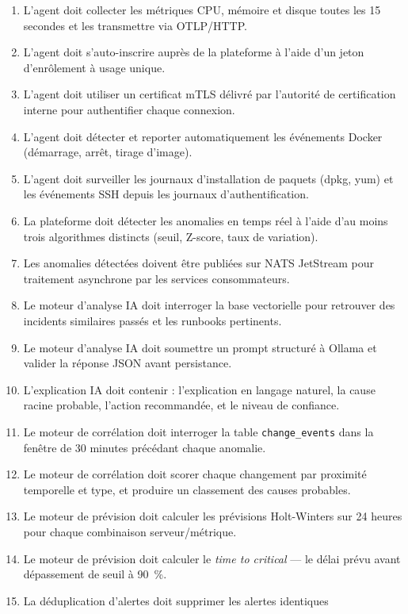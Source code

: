 \begin{enumerate}[label=\textbf{BF\arabic*}, leftmargin=2.2cm, itemsep=4pt]
  \item L'agent doit collecter les métriques CPU, mémoire et disque toutes les
    15 secondes et les transmettre via OTLP/HTTP.
  \item L'agent doit s'auto-inscrire auprès de la plateforme à l'aide d'un jeton
    d'enrôlement à usage unique.
  \item L'agent doit utiliser un certificat mTLS délivré par l'autorité de
    certification interne pour authentifier chaque connexion.
  \item L'agent doit détecter et reporter automatiquement les événements Docker
    (démarrage, arrêt, tirage d'image).
  \item L'agent doit surveiller les journaux d'installation de paquets (dpkg, yum)
    et les événements SSH depuis les journaux d'authentification.
  \item La plateforme doit détecter les anomalies en temps réel à l'aide d'au moins
    trois algorithmes distincts (seuil, Z-score, taux de variation).
  \item Les anomalies détectées doivent être publiées sur NATS JetStream pour
    traitement asynchrone par les services consommateurs.
  \item Le moteur d'analyse IA doit interroger la base vectorielle pour retrouver
    des incidents similaires passés et les runbooks pertinents.
  \item Le moteur d'analyse IA doit soumettre un prompt structuré à Ollama et
    valider la réponse JSON avant persistance.
  \item L'explication IA doit contenir : l'explication en langage naturel, la
    cause racine probable, l'action recommandée, et le niveau de confiance.
  \item Le moteur de corrélation doit interroger la table \texttt{change\_events}
    dans la fenêtre de 30 minutes précédant chaque anomalie.
  \item Le moteur de corrélation doit scorer chaque changement par proximité
    temporelle et type, et produire un classement des causes probables.
  \item Le moteur de prévision doit calculer les prévisions Holt-Winters sur
    24 heures pour chaque combinaison serveur/métrique.
  \item Le moteur de prévision doit calculer le \textit{time to critical} ---
    le délai prévu avant dépassement de seuil à 90~\%.
  \item La déduplication d'alertes doit supprimer les alertes identiques

\end{enumerate}
